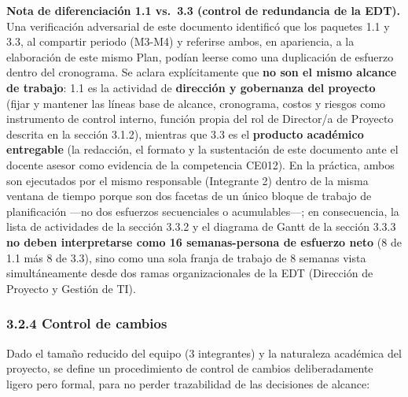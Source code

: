 \documentclass[11pt,a4paper]{article}
\begin{document}
\textbf{Nota de diferenciación 1.1 vs.~3.3 (control de redundancia de la EDT).} Una verificación adversarial de este documento identificó que los paquetes 1.1 y 3.3, al compartir periodo (M3-M4) y referirse ambos, en apariencia, a la elaboración de este mismo Plan, podían leerse como una duplicación de esfuerzo dentro del cronograma. Se aclara explícitamente que \textbf{no son el mismo alcance de trabajo}: 1.1 es la actividad de \textbf{dirección y gobernanza del proyecto} (fijar y mantener las líneas base de alcance, cronograma, costos y riesgos como instrumento de control interno, función propia del rol de Director/a de Proyecto descrita en la sección 3.1.2), mientras que 3.3 es el \textbf{producto académico entregable} (la redacción, el formato y la sustentación de este documento ante el docente asesor como evidencia de la competencia CE012). En la práctica, ambos son ejecutados por el mismo responsable (Integrante 2) dentro de la misma ventana de tiempo porque son dos facetas de un único bloque de trabajo de planificación ---no dos esfuerzos secuenciales o acumulables---; en consecuencia, la lista de actividades de la sección 3.3.2 y el diagrama de Gantt de la sección 3.3.3 \textbf{no deben interpretarse como 16 semanas-persona de esfuerzo neto} (8 de 1.1 más 8 de 3.3), sino como una sola franja de trabajo de 8 semanas vista simultáneamente desde dos ramas organizacionales de la EDT (Dirección de Proyecto y Gestión de TI).

\subsubsection{3.2.4 Control de cambios}\label{control-de-cambios}

Dado el tamaño reducido del equipo (3 integrantes) y la naturaleza académica del proyecto, se define un procedimiento de control de cambios deliberadamente ligero pero formal, para no perder trazabilidad de las decisiones de alcance:
\end{document}
